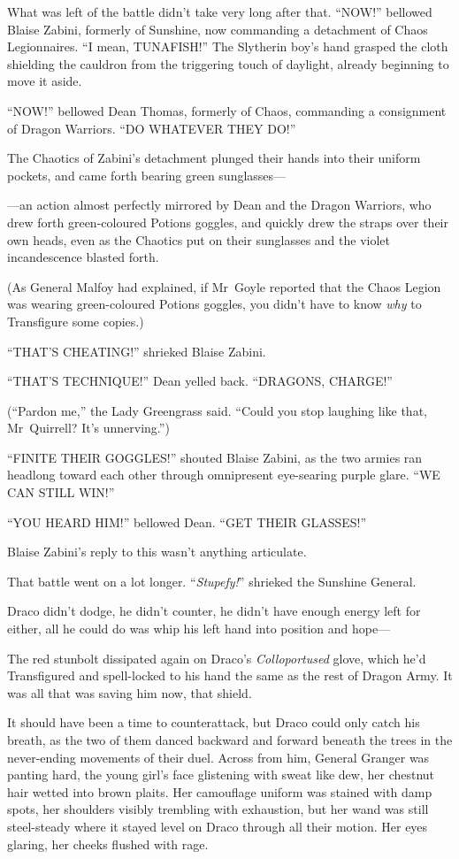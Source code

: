 What was left of the battle didn’t take very long after that.
\later
“NOW!” bellowed Blaise Zabini, formerly of Sunshine, now commanding a
detachment of Chaos Legionnaires. “I mean, TUNAFISH!” The Slytherin boy’s hand
grasped the cloth shielding the cauldron from the triggering touch of daylight,
already beginning to move it aside.

“NOW!” bellowed Dean Thomas, formerly of Chaos, commanding a consignment of
Dragon Warriors. “DO WHATEVER THEY DO!”

The Chaotics of Zabini’s detachment plunged their hands into their uniform
pockets, and came forth bearing green sunglasses—

—an action almost perfectly mirrored by Dean and the Dragon Warriors, who
drew forth green-coloured Potions goggles, and quickly drew the straps over
their own heads, even as the Chaotics put on their sunglasses and the violet
incandescence blasted forth.

(As General Malfoy had explained, if Mr~Goyle reported that the Chaos Legion
was wearing green-coloured Potions goggles, you didn’t have to know \emph{why}
to Transfigure some copies.)

“THAT’S CHEATING!” shrieked Blaise Zabini.

“THAT’S TECHNIQUE!” Dean yelled back. “DRAGONS, CHARGE!”

(“Pardon me,” the Lady Greengrass said. “Could you stop laughing like that,
Mr~Quirrell? It’s unnerving.”)

“FINITE THEIR GOGGLES!” shouted Blaise Zabini, as the two armies ran headlong
toward each other through omnipresent eye-searing purple glare. “WE CAN STILL
WIN!”

“YOU HEARD HIM!” bellowed Dean. “GET THEIR GLASSES!”

Blaise Zabini’s reply to this wasn’t anything articulate.

That battle went on a lot longer.
\later
“\emph{Stupefy!}” shrieked the Sunshine General.

Draco didn’t dodge, he didn’t counter, he didn’t have enough energy left for
either, all he could do was whip his left hand into position and hope—

The red stunbolt dissipated again on Draco’s \emph{Colloportused} glove, which
he’d Transfigured and spell-locked to his hand the same as the rest of Dragon
Army. It was all that was saving him now, that shield.

It should have been a time to counterattack, but Draco could only catch his
breath, as the two of them danced backward and forward beneath the trees in the
never-ending movements of their duel. Across from him, General Granger was
panting hard, the young girl’s face glistening with sweat like dew, her
chestnut hair wetted into brown plaits. Her camouflage uniform was stained with
damp spots, her shoulders visibly trembling with exhaustion, but her wand was
still steel-steady where it stayed level on Draco through all their motion. Her
eyes glaring, her cheeks flushed with rage.

